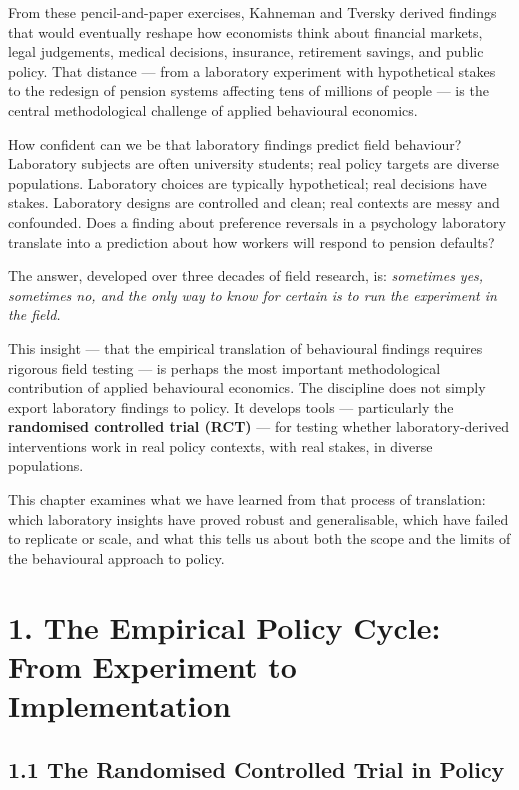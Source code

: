 \documentclass[12pt, letterpaper]{article}
\begin{document}
From these pencil-and-paper exercises, Kahneman and Tversky derived findings that would eventually reshape how economists think about financial markets, legal judgements, medical decisions, insurance, retirement savings, and public policy. That distance --- from a laboratory experiment with hypothetical stakes to the redesign of pension systems affecting tens of millions of people --- is the central methodological challenge of applied behavioural economics.

How confident can we be that laboratory findings predict field behaviour? Laboratory subjects are often university students; real policy targets are diverse populations. Laboratory choices are typically hypothetical; real decisions have stakes. Laboratory designs are controlled and clean; real contexts are messy and confounded. Does a finding about preference reversals in a psychology laboratory translate into a prediction about how workers will respond to pension defaults?

The answer, developed over three decades of field research, is: \textit{sometimes yes, sometimes no, and the only way to know for certain is to run the experiment in the field.}

This insight --- that the empirical translation of behavioural findings requires rigorous field testing --- is perhaps the most important methodological contribution of applied behavioural economics. The discipline does not simply export laboratory findings to policy. It develops tools --- particularly the \textbf{randomised controlled trial (RCT)} --- for testing whether laboratory-derived interventions work in real policy contexts, with real stakes, in diverse populations.

This chapter examines what we have learned from that process of translation: which laboratory insights have proved robust and generalisable, which have failed to replicate or scale, and what this tells us about both the scope and the limits of the behavioural approach to policy.

\medskip


\section{1. The Empirical Policy Cycle: From Experiment to Implementation}



\subsection{1.1 The Randomised Controlled Trial in Policy}
\end{document}

